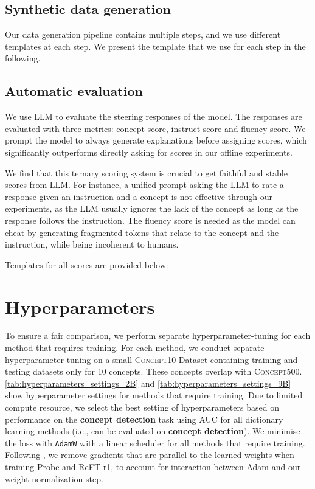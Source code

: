 \documentclass{article}
\theoremstyle{plain}
\theoremstyle{definition}
\theoremstyle{remark}
\newcommand{\methodtag}[2]{%
  \tikz[baseline=(char.base)]{%
    \node[
      fill=#1,
      rounded corners=2pt,
      text=white,
      font=\bfseries,
      minimum width=1em,
      minimum height=1em,
      align=center,
      inner sep=0pt
    ](char){#2};%
  }%
}
\newcommand{\concepttag}{\protect\methodtag{conceptcolor}{C}}
\begin{document}


\subsection{Synthetic data generation}\label{sec:generation-prompts}
Our data generation pipeline contains multiple steps, and we use different templates at each step. We present the template that we use for each step in the following.



\subsection{Automatic evaluation}\label{sec:evaluation-prompts}
We use LLM to evaluate the steering responses of the model. The responses are evaluated with three metrics: concept score, instruct score and fluency score. We prompt the model to always generate explanations before assigning scores, which significantly outperforms directly asking for scores in our offline experiments.

We find that this ternary scoring system is crucial to get faithful and stable scores from LLM. For instance, a unified prompt asking the LLM to rate a response given an instruction and a concept is not effective through our experiments, as the LLM usually ignores the lack of the concept as long as the response follows the instruction. The fluency score is needed as the model can cheat by generating fragmented tokens that relate to the concept and the instruction, while being incoherent to humans.

Templates for all scores are provided below:



\section{Hyperparameters}\label{sec:hyperparameters}
To ensure a fair comparison, we perform separate hyperparameter-tuning for each method that requires training.
For each method, we conduct separate hyperparameter-tuning on a small \textsc{Concept10} Dataset containing training and testing datasets only for 10 concepts. These concepts overlap with \textsc{Concept500}. \cref{tab:hyperparameters_settings_2B} and \cref{tab:hyperparameters_settings_9B} show hyperparameter settings for methods that require training. Due to limited compute resource, we select the best setting of hyperparameters based on performance on the \textbf{\concepttag{} concept detection} task using AUC for all dictionary learning methods (i.e., can be evaluated on \textbf{\concepttag{} concept detection}).  We minimise the loss with \texttt{AdamW} with a linear scheduler for all methods that require training. Following \citet{gao2024scalingevaluatingsparseautoencoders}, we remove gradients that are parallel to the learned weights when training Probe and ReFT-r1, to account for interaction between Adam and our weight normalization step.
\end{document}

